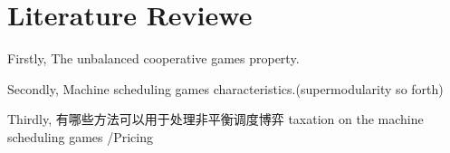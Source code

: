 \section{Literature Reviewe}
\cite{caprara2010new}
\cite{liu2018simultaneous}
\cite{schulz2010sharing}
\cite{bachrach2009cost}
\cite{bondareva1963some}
\cite{cai2012coordination}
\cite{goemans2004cooperative}
\cite{aydinliyim2010coordination}
\cite{curiel1989sequencing}
\cite{jain2007cost}
\cite{liu2009complexity}
\cite{liu2016computing}



Firstly, The unbalanced cooperative games property.

Secondly, Machine scheduling games characteristics.(supermodularity so forth)

Thirdly, 有哪些方法可以用于处理非平衡调度博弈
taxation on the machine scheduling games /Pricing

